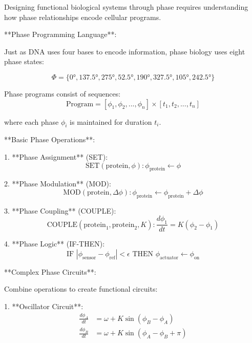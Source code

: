 \documentclass[12pt,a4paper]{report}
\begin{document}
Designing functional biological systems through phase requires understanding how phase relationships encode cellular programs.

**Phase Programming Language**:

Just as DNA uses four bases to encode information, phase biology uses eight phase states:

\begin{equation}
\Phi = \{0°, 137.5°, 275°, 52.5°, 190°, 327.5°, 105°, 242.5°\}
\end{equation}

Phase programs consist of sequences:
\begin{equation}
\text{Program} = [\phi_1, \phi_2, ..., \phi_n] \times [t_1, t_2, ..., t_n]
\end{equation}

where each phase $\phi_i$ is maintained for duration $t_i$.

**Basic Phase Operations**:

1. **Phase Assignment** (SET):
   \begin{equation}
   \text{SET}(\text{protein}, \phi) : \phi_{\text{protein}} \leftarrow \phi
   \end{equation}

2. **Phase Modulation** (MOD):
   \begin{equation}
   \text{MOD}(\text{protein}, \Delta\phi) : \phi_{\text{protein}} \leftarrow \phi_{\text{protein}} + \Delta\phi
   \end{equation}

3. **Phase Coupling** (COUPLE):
   \begin{equation}
   \text{COUPLE}(\text{protein}_1, \text{protein}_2, K) : \frac{d\phi_1}{dt} = K(\phi_2 - \phi_1)
   \end{equation}

4. **Phase Logic** (IF-THEN):
   \begin{equation}
   \text{IF } |\phi_{\text{sensor}} - \phi_{\text{ref}}| < \epsilon \text{ THEN } \phi_{\text{actuator}} \leftarrow \phi_{\text{on}}
   \end{equation}

**Complex Phase Circuits**:

Combine operations to create functional circuits:

1. **Oscillator Circuit**:
   \begin{equation}
   \begin{aligned}
   \frac{d\phi_A}{dt} &= \omega + K \sin(\phi_B - \phi_A) \\
   \frac{d\phi_B}{dt} &= \omega + K \sin(\phi_A - \phi_B + \pi)
   \end{aligned}
   \end{equation}
\end{document}
